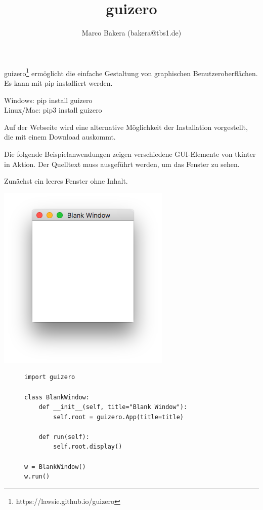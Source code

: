\documentclass{tufte-handout}
\title{guizero}
\date{}
\author{Marco Bakera (bakera@tbs1.de)}
\begin{document}
\maketitle

guizero\footnote{https://lawsie.github.io/guizero} ermöglicht die einfache
Gestaltung von graphischen Benutzeroberflächen.
Es kann mit pip installiert werden.
\begin{marginfigure}
 Windows: pip install guizero\\ \noindent
 Linux/Mac: pip3 install guizero
\end{marginfigure}
  
Auf der Webseite wird eine alternative Möglichkeit der Installation
vorgestellt, die mit einem Download auskommt.
 
 
Die folgende Beispielanwendungen zeigen verschiedene GUI-Elemente von tkinter in Aktion. Der Quelltext muss ausgeführt werden, um das Fenster zu sehen. 
 
Zunächst ein leeres Fenster ohne Inhalt.

\begin{marginfigure}[3cm]
	\includegraphics[width=\textwidth]{../blank_window}
\end{marginfigure}

\begin{figure}
\begin{lstlisting}
import guizero

class BlankWindow:
    def __init__(self, title="Blank Window"):
        self.root = guizero.App(title=title)

    def run(self):
        self.root.display()

w = BlankWindow()
w.run()
\end{lstlisting}
\end{figure} 
\end{document}
